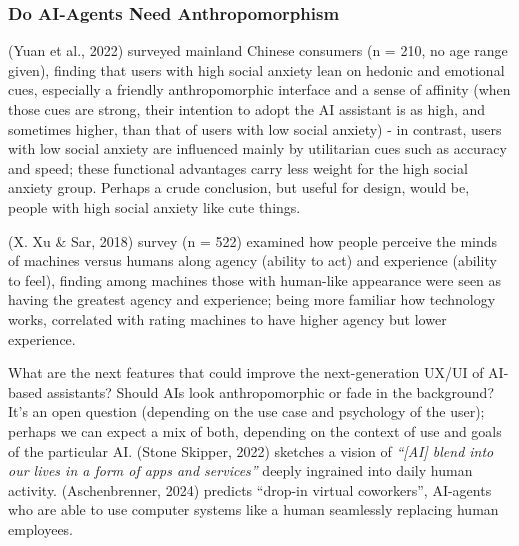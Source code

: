 \documentclass[
  letterpaper,
  DIV=11,
  numbers=noendperiod]{scrartcl}
\begin{document}
\subsubsection{Do AI-Agents Need
Anthropomorphism}\label{do-ai-agents-need-anthropomorphism}

(Yuan et al., 2022) surveyed mainland Chinese consumers (n = 210, no age
range given), finding that users with high social anxiety lean on
hedonic and emotional cues, especially a friendly anthropomorphic
interface and a sense of affinity (when those cues are strong, their
intention to adopt the AI assistant is as high, and sometimes higher,
than that of users with low social anxiety) - in contrast, users with
low social anxiety are influenced mainly by utilitarian cues such as
accuracy and speed; these functional advantages carry less weight for
the high social anxiety group. Perhaps a crude conclusion, but useful
for design, would be, people with high social anxiety like cute things.

(X. Xu \& Sar, 2018) survey (n = 522) examined how people perceive the
minds of machines versus humans along agency (ability to act) and
experience (ability to feel), finding among machines those with
human-like appearance were seen as having the greatest agency and
experience; being more familiar how technology works, correlated with
rating machines to have higher agency but lower experience.

What are the next features that could improve the next-generation UX/UI
of AI-based assistants? Should AIs look anthropomorphic or fade in the
background? It's an open question (depending on the use case and
psychology of the user); perhaps we can expect a mix of both, depending
on the context of use and goals of the particular AI. (Stone Skipper,
2022) sketches a vision of \emph{``{[}AI{]} blend into our lives in a
form of apps and services''} deeply ingrained into daily human activity.
(Aschenbrenner, 2024) predicts ``drop-in virtual coworkers'', AI-agents
who are able to use computer systems like a human seamlessly replacing
human employees.
\end{document}

